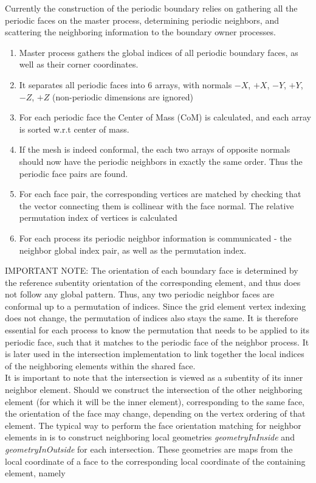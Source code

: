 \noindent
Currently the construction of the periodic boundary relies on gathering all the periodic faces on the master process, determining periodic neighbors, and scattering the neighboring information to the boundary owner processes.

\begin{mybox}
\begin{enumerate}
 \item Master process gathers the global indices of all periodic boundary faces, as well as their corner coordinates. 
 \item It separates all periodic faces into 6 arrays, with normals $-X$, $+X$, $-Y$, $+Y$, $-Z$, $+Z$ (non-periodic dimensions are ignored)
 \item For each periodic face the Center of Mass (CoM) is calculated, and each array is sorted w.r.t center of mass.
 \item If the mesh is indeed conformal, the each two arrays of opposite normals should now have the periodic neighbors in exactly the same order. Thus the periodic face pairs are found.
 \item For each face pair, the corresponding vertices are matched by checking that the vector connecting them is collinear with the face normal. The relative permutation index of vertices is calculated
 \item For each process its periodic neighbor information is communicated - the neighbor global index pair, as well as the permutation index.
\end{enumerate}
\end{mybox}

\noindent
IMPORTANT NOTE: The orientation of each boundary face is determined by the reference subentity orientation of the corresponding element, and thus does not follow any global pattern. Thus, any two periodic neighbor faces are conformal up to a permutation of indices. Since the grid element vertex indexing does not change, the permutation of indices also stays the same. It is therefore essential for each process to know the permutation that needs to be applied to its periodic face, such that it matches to the periodic face of the neighbor process. It is later used in the intersection implementation to link together the local indices of the neighboring elements within the shared face. \\

\noindent
It is important to note that the intersection is viewed as a subentity of its inner neighbor element. Should we construct the intersection of the other neighboring element (for which it will be the inner element), corresponding to the same face, the orientation of the face may change, depending on the vertex ordering of that element. The typical way to perform the face orientation matching for neighbor elements in \dune{} is to construct neighboring local geometries \textit{geometryInInside} and \textit{geometryInOutside} for each intersection. These geometries are maps from the local coordinate of a face to the corresponding local coordinate of the containing element, namely

